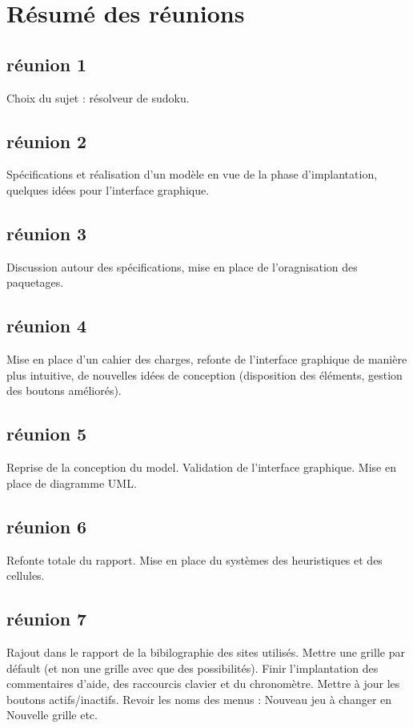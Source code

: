 \section{Résumé des réunions}

\subsection{réunion 1}
Choix du sujet : résolveur de sudoku.

\subsection{réunion 2}
Spécifications et réalisation d'un modèle 
en vue de la phase d'implantation, 
quelques idées pour l'interface graphique.

\subsection{réunion 3}
Discussion autour des spécifications, 
mise en place de l'oragnisation des paquetages.

\subsection{réunion 4}
Mise en place d'un cahier des charges, 
refonte de l'interface graphique de manière plus intuitive, 
de nouvelles idées de conception 
(disposition des éléments, gestion des boutons améliorés). 

\subsection{réunion 5}
Reprise de la conception du model.\newline
Validation de l'interface graphique.\newline
Mise en place de diagramme UML.

\subsection{réunion 6}
Refonte totale du rapport.
Mise en place du systèmes des heuristiques et des cellules.

\subsection{réunion 7}
Rajout dans le rapport de la bibilographie des sites utilisés.
Mettre une grille par défault (et non une grille avec que des possibilités).
Finir l'implantation des commentaires d'aide, des raccourcis clavier et du chronomètre.
Mettre à jour les boutons actifs/inactifs.
Revoir les noms des menus : Nouveau jeu à changer en Nouvelle grille etc.

